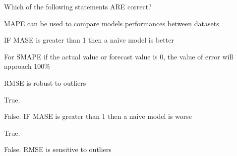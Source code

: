 
\begin{question}
Which of the following statements ARE correct?
\begin{answerlist}
  \item MAPE can be used to compare models performances between datasets
  \item IF MASE is greater than 1 then a naive model is better
  \item For SMAPE if the actual value or forecast value is 0, the value of error will approach 100\%
  \item RMSE is robust to outliers
\end{answerlist}
\end{question}

\begin{solution}
\begin{answerlist}
  \item True.
  \item False. IF MASE is greater than 1 then a naive model is worse
  \item True.
  \item False. RMSE is sensitive to outliers
\end{answerlist}
\end{solution}

